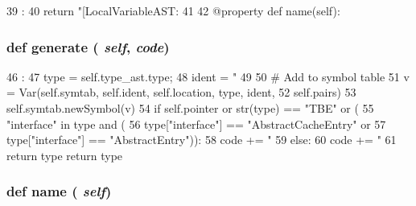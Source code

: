\begin{DoxyCode}
39                       :
40         return "[LocalVariableAST: %
41 
42     @property
    def name(self):
\end{DoxyCode}
\hypertarget{classslicc_1_1ast_1_1LocalVariableAST_1_1LocalVariableAST_a4555d1cee0dccf3942ea35fe86de2e8e}{
\subsubsection[{generate}]{\setlength{\rightskip}{0pt plus 5cm}def generate ( {\em self}, \/   {\em code})}}
\label{classslicc_1_1ast_1_1LocalVariableAST_1_1LocalVariableAST_a4555d1cee0dccf3942ea35fe86de2e8e}



\begin{DoxyCode}
46                             :
47         type = self.type_ast.type;
48         ident = "%
49 
50         # Add to symbol table
51         v = Var(self.symtab, self.ident, self.location, type, ident,
52                 self.pairs)
53         self.symtab.newSymbol(v)
54         if self.pointer or str(type) == "TBE" or (
55            "interface" in type and (
56                type["interface"] == "AbstractCacheEntry" or
57                type["interface"] == "AbstractEntry")):
58             code += "%
59         else:
60             code += "%
61         return type
        return type
\end{DoxyCode}
\hypertarget{classslicc_1_1ast_1_1LocalVariableAST_1_1LocalVariableAST_a757840459670ee7692e00cf5ddc722d5}{
\subsubsection[{name}]{\setlength{\rightskip}{0pt plus 5cm}def name ( {\em self})}}
\label{classslicc_1_1ast_1_1LocalVariableAST_1_1LocalVariableAST_a757840459670ee7692e00cf5ddc722d5}



